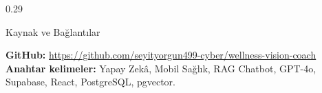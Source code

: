 \documentclass[final]{beamer}
\newenvironment{posterblock}[1]{%
  \begin{block}{#1}\justifying\small
}{%
  \end{block}
}
\begin{document}
\begin{frame}[t]
\begin{columns}[t,totalwidth=\textwidth]
\begin{column}{0.29\textwidth}
\begin{posterblock}{Kaynak ve Bağlantılar}
\small
\textbf{GitHub:} \url{https://github.com/seyityorgun499-cyber/wellness-vision-coach}\\
\textbf{Anahtar kelimeler:} Yapay Zekâ, Mobil Sağlık, RAG Chatbot, GPT-4o, Supabase, React, PostgreSQL, pgvector.
\end{posterblock}

\end{column}

\end{columns}

\end{frame}
\end{document}
